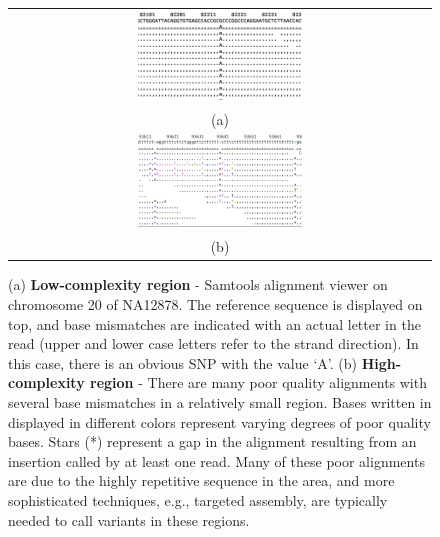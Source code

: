 \documentclass[12pt]{article}
\begin{document}
\begin{figure}[h!]
\begin{center}
\begin{tabular} {@{}c@{}}
  \includegraphics[width=0.40\textwidth]{figs/snp.png} \\ %
   (a) \\
  \includegraphics[width=0.40\textwidth]{figs/high-weirdness.png} \\
   (b) \\
\end{tabular}
\end{center}
\caption{(a) \textbf{Low-complexity region} - Samtools alignment viewer on
chromosome 20 of NA12878.  The reference sequence is displayed on top, and base
mismatches are indicated with an actual letter in the read (upper and lower
case letters refer to the strand direction).  In this case, there is an obvious
SNP with the value `A'. (b) \textbf{High-complexity region} - There are many
poor quality alignments with several base mismatches in a relatively small
region. Bases written in displayed in different colors represent varying degrees of poor quality bases. Stars (*) represent a gap in the alignment resulting from an insertion called by at least one read. Many of these poor alignments are due to the highly repetitive
sequence in the area, and more sophisticated techniques, e.g., targeted assembly,
are typically needed to call variants in these regions.  }
  \label{low-complexity}
\end{figure}
\end{document}
